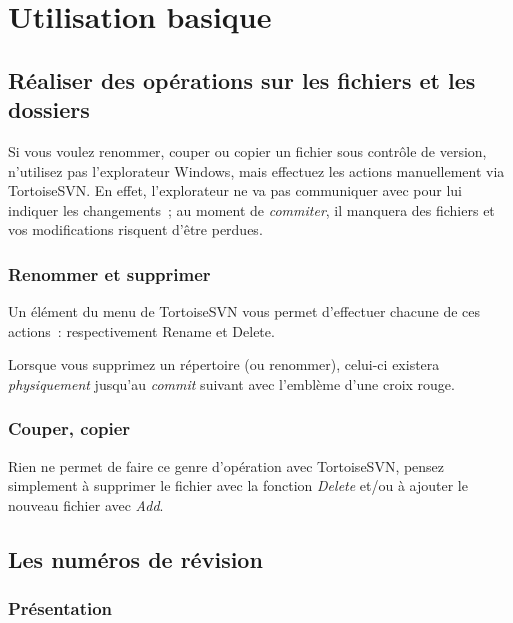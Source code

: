 \chapter{Utilisation basique}

\section{Réaliser des opérations sur les fichiers et les dossiers}

Si vous voulez renommer, couper ou copier un fichier sous contrôle de version, n'utilisez pas l'explorateur Windows, mais effectuez les actions manuellement via TortoiseSVN. En effet, l'explorateur ne va pas communiquer avec \svn{} pour lui indiquer les changements~; au moment de \emph{commiter}, il manquera des fichiers et vos modifications risquent d'être perdues.

\subsection{Renommer et supprimer}

Un élément du menu de TortoiseSVN vous permet d'effectuer chacune de ces actions~: respectivement Rename et Delete.


Lorsque vous supprimez un répertoire (ou renommer), celui-ci existera \emph{physiquement} jusqu'au \emph{commit} suivant avec l'emblème d'une croix rouge.

\subsection{Couper, copier}

Rien ne permet de faire ce genre d'opération avec TortoiseSVN, pensez simplement à supprimer le fichier avec la fonction \emph{Delete} et/ou à ajouter le nouveau fichier avec \emph{Add}.


\section{Les numéros de révision}

\subsection{Présentation}

